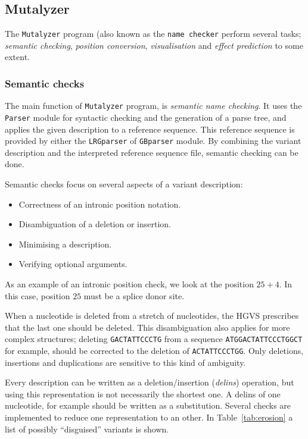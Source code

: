 \documentclass{article}
\begin{document}
\subsection{Mutalyzer} \label{subsec:mutalyzer}
The \texttt{Mutalyzer} program (also known as the \texttt{name checker} perform
several tasks; \emph{semantic checking}, \emph{position conversion},
\emph{visualisation} and \emph{effect prediction} to some extent.

\subsubsection{Semantic checks}
The main function of \texttt{Mutalyzer} program, is \emph{semantic name
checking}. It uses the \texttt{Parser} module for syntactic checking and the
generation of a parse tree, and applies the given description to a reference
sequence. This reference sequence is provided by either the \texttt{LRGparser}
of \texttt{GBparser} module. By combining the variant description and the
interpreted reference sequence file, semantic checking can be done.

Semantic checks focus on several aspects of a variant description:
\begin{itemize}
\item Correctness of an intronic position notation.
\item Disambiguation of a deletion or insertion.
\item Minimising a description.
\item Verifying optional arguments.
\end{itemize}

As an example of an intronic position check, we look at the position $25+4$. In
this case, position $25$ must be a splice donor site.

When a nucleotide is deleted from a stretch of nucleotides, the HGVS prescribes
that the last one should be deleted. This disambiguation also applies for more
complex structures; deleting \verb#GACTATTCCCTG# from a sequence
\verb#ATGGACTATTCCCTGGCT# for example, should be corrected to the deletion of
\verb#ACTATTCCCTGG#. Only deletions, insertions and duplications are sensitive
to this kind of ambiguity.

Every description can be written as a deletion/insertion (\emph{delins})
operation, but using this representation is not necessarily the shortest one. A
delins of one nucleotide, for example should be written as a substitution.
Several checks are implemented to reduce one representation to an other. In
Table~\ref{tab:erosion} a list of possibly ``disguised'' variants is shown.
\end{document}
